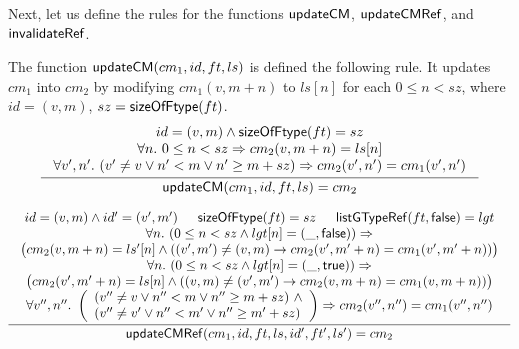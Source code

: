 Next, let us define the rules for the functions ${\sf updateCM}$, ${\sf updateCMRef}$, and ${\sf invalidateRef}$.

The function ${\sf updateCM}(cm_1, id, ft, ls)$ is defined the following rule. It updates $cm_1$ into $cm_2$ by modifying $cm_1(v, m+n)$ to $ls[n]$ for each $0 \le n < sz$, where $id = (v, m)$, $sz = {\sf sizeOfFtype}(ft)$. 
%
\begin{gather*}
		\infer[]
		{\updatecm(cm_1, id, ft, ls) = cm_2}
		{
			\begin{array}{c}
				id = (v, m) \wedge \sizeofftype(ft) = sz \\
				\forall n.\ 0 \le n < sz \Rightarrow cm_2(v, m+n) = ls[n] \\
				\forall v', n'.\ (v' \neq v \vee n' < m \vee n' \ge m+sz) \Rightarrow cm_2(v', n') = cm_1(v', n') \\
			\end{array}
		}
\end{gather*}	

\begin{gather*}
		\infer[]
		{\updatecmref(cm_1, id, ft, ls, id', ft', ls') = cm_2}
		{
			\begin{array}{c}
				id = (v, m) \wedge id' = (v', m') \hspace{15pt} \sizeofftype(ft) = sz \hspace{15pt} \listgtyperef(ft, \lfalse) = lgt \\
				\forall n.\ (0 \le n < sz \wedge lgt[n] = (\_, \lfalse)) \Rightarrow \\
				\big(
					cm_2(v, m+n) = ls'[n] \wedge ((v',m') \neq (v, m)  \rightarrow cm_2(v', m' + n) = cm_1(v', m'+n)) 
				\big)
				\\ 
				\forall n.\ (0 \le n < sz \wedge lgt[n] = (\_, \ltrue)) \Rightarrow \\
				\big(
					cm_2(v', m'+n) = ls[n] \wedge  
					((v, m) \neq (v', m')  \rightarrow cm_2(v, m + n) = cm_1(v, m+n))
				\big)
				\\
				\forall v'', n''.\ 
				\left(
				\begin{array}{l}
					(v'' \neq v \vee n'' < m \vee n'' \ge m+sz)\ \wedge \\
					(v'' \neq v' \vee n'' < m' \vee n'' \ge m'+sz)
				\end{array}
				\right)
				\Rightarrow cm_2(v'', n'') = cm_1(v'', n'') 
			\end{array}
		}
\end{gather*}

